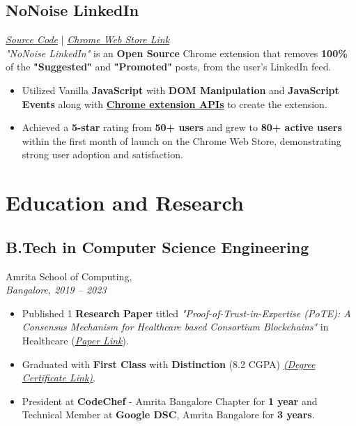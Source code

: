 \documentclass[a4paper,12pt]{article}
\begin{document}
\subsection*{NoNoise LinkedIn} \textit{\href{https://github.com/karan51ngh/no-noise-linkedin}{Source Code}} | \textit{\href{https://chromewebstore.google.com/detail/nonoise-linkedin/hbcjelfhlljdepmifggbmhnklhmdmldn}{Chrome Web Store Link}} \\
\textit{"NoNoise LinkedIn"} is an \textbf{Open Source} Chrome extension that removes \textbf{100\%} of the \textbf{"Suggested"} and \textbf{"Promoted"} posts, from the user's LinkedIn feed.
\begin{itemize}[leftmargin=1.5em]
    \item Utilized Vanilla \textbf{JavaScript} with \textbf{DOM Manipulation} and \textbf{JavaScript Events} along with \textbf{\href{https://developer.chrome.com/docs/extensions/reference/api}{Chrome extension APIs}} to create the extension.
    \item Achieved a \textbf{5-star} rating from \textbf{50+ users} and grew to \textbf{80+ active users} within the first month of launch on the Chrome Web Store, demonstrating strong user adoption and satisfaction.
\end{itemize}

\section*{Education and Research}

\subsection*{B.Tech in Computer Science Engineering}
{Amrita School of Computing},  \\ \textit{Bangalore, 2019 -- 2023} 
\begin{itemize}[leftmargin=1.5em]
    \item Published 1 \textbf{Research Paper} titled \textit{"Proof-of-Trust-in-Expertise (PoTE): A Consensus Mechanism for Healthcare based Consortium Blockchains"} in Healthcare (\textit{\href{https://papers.ssrn.com/sol3/papers.cfm?abstract_id=4804243}{Paper Link}}).
    \item Graduated with \textbf{First Class} with \textbf{Distinction} (8.2 CGPA) \textit{\href{https://drive.google.com/drive/folders/1Hu5mrXyz4nnYDJhT7x9IuLwLyBzCwkKB}{(Degree Certificate Link)}}.
    \item President at \textbf{CodeChef} - Amrita Bangalore Chapter for \textbf{1 year} and Technical Member at \textbf{Google DSC}, Amrita Bangalore for \textbf{3 years}.
\end{itemize}
\end{document}
